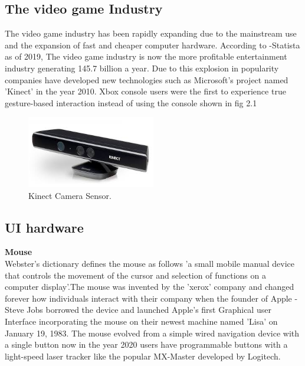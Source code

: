 \subsection{The video game Industry  }


The video game industry has been rapidly expanding due to the mainstream use and the expansion of fast and cheaper computer hardware. According to -Statista as of 2019, The video game industry is now the more profitable entertainment industry generating 145.7 billion a year. Due to this explosion in popularity companies have developed new technologies such as Microsoft's project named 'Kinect' in the year 2010. Xbox console users were the first to experience true gesture-based interaction instead of using the console shown in fig 2.1
\begin{figure}[h!]
  \centering
    \includegraphics[width=0.5\textwidth]{Research-Latex/images/kinect.jpeg}
     \caption{Kinect Camera Sensor.}
\end{figure}

\subsection{UI hardware}


\textbf{Mouse}\\
Webster's dictionary defines the mouse as follows 'a small mobile manual device that controls the movement of the cursor and selection of functions on a computer display'.The mouse was invented by the 'xerox' company and changed forever how individuals interact with their company when the founder of Apple - Steve Jobs borrowed the device and launched Apple's first Graphical user Interface incorporating the mouse on their newest machine named 'Lisa' on January 19, 1983. The mouse evolved from a simple wired navigation device with a single button now in the year 2020 users have programmable buttons with a light-speed laser tracker like the popular MX-Master developed by Logitech.



